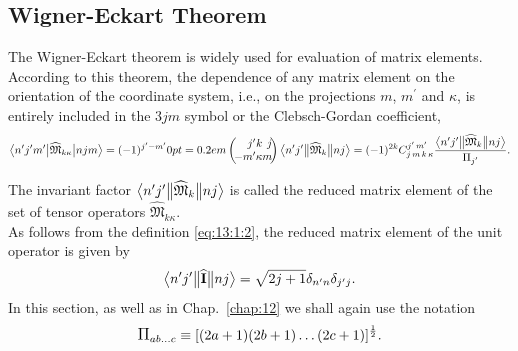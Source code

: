 \subsection{Wigner-Eckart Theorem}\label{sec:13.1.1}
The Wigner-Eckart theorem is widely used for evaluation of matrix elements. According to this theorem, the dependence of any matrix element on the orientation of the coordinate system, i.e., on the projections \(m\), \(m^{\prime}\) and \(\kappa\), is entirely included in the \(3 j m\) symbol or the Clebsch-Gordan coefficient,
\begin{equation}
\braOket{ n^{\prime} j^{\prime} m^{\prime}}{ \widehat{\mathfrak{M}}_{k \kappa}}{n j m}=(-1)^{j^{\prime}-m^{\prime}}\threej{j^{\prime}}{k}{j}{-m^{\prime}}{\kappa}{m}
\braOketred{ n^{\prime} j^{\prime}}{\widehat{\mathfrak{M}}_{k}}{ n j}=(-1)^{2 k} 
\clebsch{j}{m}{k}{\kappa}{j^{\prime}}{m^{\prime}} \frac{
\braOketred{ n^{\prime} j^{\prime}}{\widehat{\mathfrak{M}}_{k}}{ n j}}{\Fact{j^{\prime}}}. \label{eq:13:1:2}
\end{equation}

The invariant factor \(
\bigl\langle  n^{\prime} j^{\prime} \big\Vert \widehat{\mathfrak{M}}_{k} \big\Vert  n j \bigr\rangle\) is called the reduced matrix element of the set of tensor operators \(\widehat{\mathfrak{M}}_{k \kappa}\).\\
As follows from the definition \eqref{eq:13:1:2}, the reduced matrix element of the unit operator is given by
\begin{equation}
\bigl\langle  n^{\prime} j^{\prime} \big\Vert \widehat{\mathbf{I}} \big\Vert  n j \bigr\rangle=\sqrt{2 j+1} \delta_{n^{\prime} n} \delta_{j^{\prime} j}.  \label{eq:13:1:3}
\end{equation}
In this section, as well as in Chap.~\ref{chap:12} we shall again use the notation
\begin{equation*}
\Fact{a b \ldots c} \equiv[(2 a+1)(2 b+1) \ldots(2 c+1)]^{\frac{1}{2}}.
\end{equation*}

